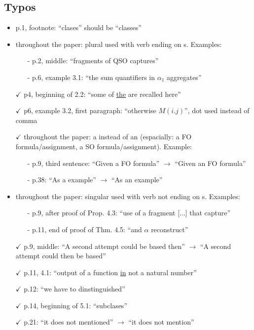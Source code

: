 \documentclass[a4paper]{article}
\begin{document}
\subsection*{Typos}
\begin{itemize}
	\setlength\itemsep{0.5em}
	\item p.1, footnote: ``clases'' should be ``classes''
	\item throughout the paper: plural used with verb ending on s. Examples:
	\begin{itemize}
		\item[-] p.2, middle: ``fragments of QSO captures''
		\item[-] p.6, example 3.1: ``the sum quantifiers in $\alpha_1$ aggregates''
	\end{itemize}
	\item[$\checkmark$] p4, beginning of 2.2: ``some of \underline{the} are recalled here''
	\item[$\checkmark$] p6, example 3.2, first paragraph: ``otherwise $M(i.j)$'', dot used instead of comma
	\item[$\checkmark$] throughout the paper: a instead of an (espacially: a FO formula/assignment, a SO formula/assignment).
	Example:
	\begin{itemize}
		\item[-] p.9, third sentence: ``Given a FO formula'' $\to$ ``Given an FO formula''
		\item[-] p.38: ``As a example'' $\to$ ``As an example''
	\end{itemize}
	\item throughout the paper: singular used with verb not ending on s. Examples:
	\begin{itemize}
		\item[-] p.9, after proof of Prop. 4.3: ``use of a fragment [...] that capture''
		\item[-] p.11, end of proof of Thm. 4.5: ``and $\alpha$ reconstruct''
	\end{itemize}
	\item[$\checkmark$] p.9, middle: ``A second attempt could be based then'' $\to$ ``A second attempt could then be
	based''
	\item[$\checkmark$] p.11, 4.1: ``output of a function \underline{in} not a natural number''
	\item[$\checkmark$] p.12: ``we have to dinstinguished''
	\item[$\checkmark$] p.14, beginning of 5.1: ``subclases''
	\item[$\checkmark$] p.21: ``it does not mentioned'' $\to$ ``it does not mention''

\end{itemize}
\end{document}
